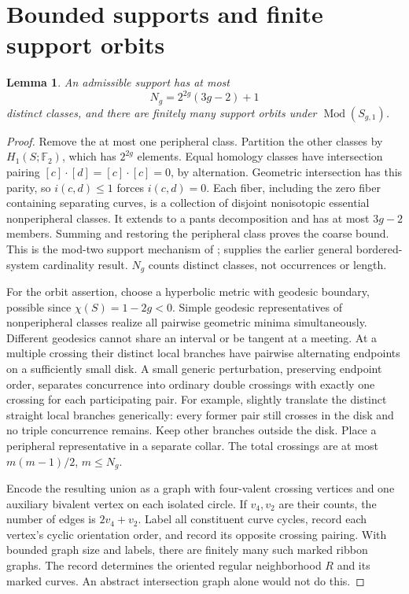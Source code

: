 \documentclass[11pt]{article}
\newtheorem{lemma}[theorem]{Lemma}
\newcommand{\Mod}{\operatorname{Mod}}
\newcommand{\F}{\mathbb F}
\begin{document}
\section{Bounded supports and finite support orbits}\label{sec:support}
\begin{lemma}\label{lem:support}
An admissible support has at most
\[
N_g=2^{2g}(3g-2)+1
\]
distinct classes, and there are finitely many support orbits under $\Mod(S_{g,1})$.
\end{lemma}
\begin{proof}
Remove the at most one peripheral class. Partition the other classes by $H_1(S;\F_2)$, which has $2^{2g}$ elements. Equal homology classes have intersection pairing $[c]\cdot[d]=[c]\cdot[c]=0$, by alternation. Geometric intersection has this parity, so $i(c,d)\leq1$ forces $i(c,d)=0$. Each fiber, including the zero fiber containing separating curves, is a collection of disjoint nonisotopic essential nonperipheral classes. It extends to a pants decomposition and has at most $3g-2$ members. Summing and restoring the peripheral class proves the coarse bound. This is the mod-two support mechanism of \cite{MRT}; \cite[Theorem 3.3]{JMM} supplies the earlier general bordered-system cardinality result. $N_g$ counts distinct classes, not occurrences or length.

For the orbit assertion, choose a hyperbolic metric with geodesic boundary, possible since $\chi(S)=1-2g<0$. Simple geodesic representatives of nonperipheral classes realize all pairwise geometric minima simultaneously. Different geodesics cannot share an interval or be tangent at a meeting. At a multiple crossing their distinct local branches have pairwise alternating endpoints on a sufficiently small disk. A small generic perturbation, preserving endpoint order, separates concurrence into ordinary double crossings with exactly one crossing for each participating pair. For example, slightly translate the distinct straight local branches generically: every former pair still crosses in the disk and no triple concurrence remains. Keep other branches outside the disk. Place a peripheral representative in a separate collar. The total crossings are at most $m(m-1)/2$, $m\leq N_g$.

Encode the resulting union as a graph with four-valent crossing vertices and one auxiliary bivalent vertex on each isolated circle. If $v_4,v_2$ are their counts, the number of edges is $2v_4+v_2$. Label all constituent curve cycles, record each vertex's cyclic orientation order, and record its opposite crossing pairing. With bounded graph size and labels, there are finitely many such marked ribbon graphs. The record determines the oriented regular neighborhood $R$ and its marked curves. An abstract intersection graph alone would not do this.


\end{proof}
\end{document}

